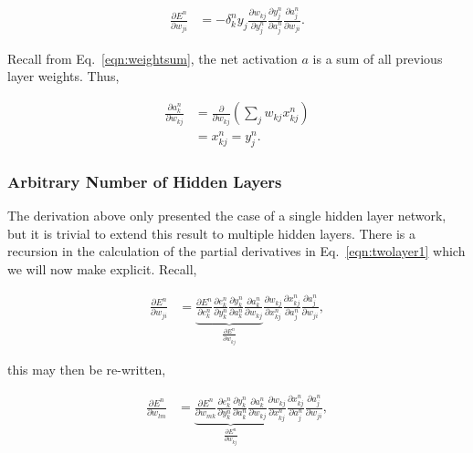 \documentclass[thesis]{subfiles}
\begin{document}
\begin{equation}
\begin{aligned}
    \frac{\partial E^n}{\partial w_{ji}} &= -\delta^n_k y_{j} \frac{\partial w_{kj}}{\partial y^n_{j}}\frac{\partial y^n_{j}}{\partial a^n_{j}} \frac{\partial a^n_{j}}{\partial w_{ji}}.
\end{aligned}
\end{equation}








Recall from Eq.~\ref{eqn:weightsum}, the net activation $a$ is a sum of all previous layer weights. Thus,

\begin{equation}
\begin{aligned}
    \frac{\partial a^n_k}{\partial w_{kj}} &= \frac{\partial}{\partial w_{kj}}\left(\sum_j w_{kj} x^n_{kj} \right)\\
    &= x^n_{kj} = y^n_j.
\end{aligned}
\end{equation}




\subsubsection{Arbitrary Number of Hidden Layers}
The derivation above only presented the case of a single hidden layer network, but it is trivial to extend this result to multiple hidden layers. There is a recursion in the calculation of the partial derivatives in Eq.~\ref{eqn:twolayer1} which we will now make explicit. Recall,
 
\begin{equation}
\begin{aligned}
    \frac{\partial E^n}{\partial w_{ji}} &= \underbrace{\frac{\partial E^n}{\partial e^n_{k}}
    \frac{\partial e^n_{k}}{\partial y^n_{k}} \frac{\partial y^n_{k}}{\partial a^n_k} \frac{\partial a^n_k}{\partial w_{kj}}}_{\frac{\partial E^n}{\partial w_{kj}} }
    \frac{\partial w_{kj}}{\partial x^n_{kj}}\frac{\partial x^n_{kj}}{\partial a^n_{j}} \frac{\partial a^n_{j}}{\partial w_{ji}},
\end{aligned}
\end{equation}

this may then be re-written,

\begin{equation}
\begin{aligned}
    \frac{\partial E^n}{\partial w_{lm}} &= \underbrace{\frac{\partial E^n}{\partial w_{mk}}
    \frac{\partial e^n_{k}}{\partial y^n_{k}} \frac{\partial y^n_{k}}{\partial a^n_k} \frac{\partial a^n_k}{\partial w_{kj}}}_{\frac{\partial E^n}{\partial w_{kj}} }
    \frac{\partial w_{kj}}{\partial x^n_{kj}}\frac{\partial x^n_{kj}}{\partial a^n_{j}} \frac{\partial a^n_{j}}{\partial w_{ji}},
\end{aligned}
\end{equation}
\end{document}
